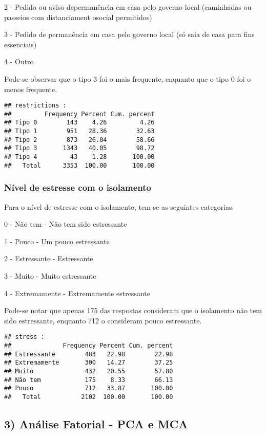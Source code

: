 \documentclass[
]{article}
\begin{document}
2 - Pedido ou aviso depermanência em casa pelo governo local (caminhadas
ou passeios com distanciament osocial permitidos)

3 - Pedido de permanência em casa pelo governo local (só saia de casa
para fins essenciais)

4 - Outro

Pode-se observar que o tipo 3 foi o mais frequente, enquanto que o tipo
0 foi o menos frequente.

\begin{verbatim}
## restrictions : 
##         Frequency Percent Cum. percent
## Tipo 0        143    4.26         4.26
## Tipo 1        951   28.36        32.63
## Tipo 2        873   26.04        58.66
## Tipo 3       1343   40.05        98.72
## Tipo 4         43    1.28       100.00
##   Total      3353  100.00       100.00
\end{verbatim}

\hypertarget{nuxedvel-de-estresse-com-o-isolamento}{%
\subsubsection{\texorpdfstring{\textbf{Nível de estresse com o
isolamento}}{Nível de estresse com o isolamento}}\label{nuxedvel-de-estresse-com-o-isolamento}}

Para o nível de estresse com o isolamento, tem-se as seguintes
categorias:

0 - Não tem - Não tem sido estressante

1 - Pouco - Um pouco estressante

2 - Estressante - Estressante

3 - Muito - Muito estressante

4 - Extremamente - Extremamente estressante

Pode-se notar que apenas 175 das respostas consideram que o isolamento
não tem sido estressante, enquanto 712 o consideram pouco estressante.

\begin{verbatim}
## stress : 
##              Frequency Percent Cum. percent
## Estressante        483   22.98        22.98
## Extremamente       300   14.27        37.25
## Muito              432   20.55        57.80
## Não tem            175    8.33        66.13
## Pouco              712   33.87       100.00
##   Total           2102  100.00       100.00
\end{verbatim}

\hypertarget{anuxe1lise-fatorial---pca-e-mca}{%
\subsection{\texorpdfstring{3) \textbf{Análise Fatorial - PCA e
MCA}}{3) Análise Fatorial - PCA e MCA}}\label{anuxe1lise-fatorial---pca-e-mca}}
\end{document}
